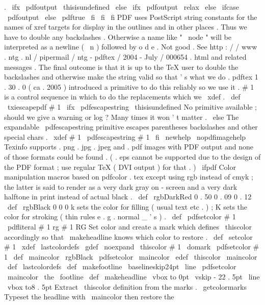 {.
\
ifx
\
pdfoutput
\
thisisundefined
\
else
\
ifx
\
pdfoutput
\
relax
\
else
\
ifcase
\
pdfoutput
\
else
\
pdftrue
\
fi
\
fi
\
fi
%
PDF
uses
PostScript
string
constants
for
the
names
of
xref
targets
%
for
display
in
the
outlines
and
in
other
places
.
Thus
we
have
to
%
double
any
backslashes
.
Otherwise
a
name
like
"
\
node
"
will
be
%
interpreted
as
a
newline
(
\
n
)
followed
by
o
d
e
.
Not
good
.
%
%
See
http
:
/
/
www
.
ntg
.
nl
/
pipermail
/
ntg
-
pdftex
/
2004
-
July
/
000654
.
html
and
%
related
messages
.
The
final
outcome
is
that
it
is
up
to
the
TeX
user
%
to
double
the
backslashes
and
otherwise
make
the
string
valid
so
%
that
'
s
what
we
do
.
pdftex
1
.
30
.
0
(
ca
.
2005
)
introduced
a
primitive
to
%
do
this
reliably
so
we
use
it
.
%
#
1
is
a
control
sequence
in
which
to
do
the
replacements
%
which
we
\
xdef
.
\
def
\
txiescapepdf
#
1
{
%
\
ifx
\
pdfescapestring
\
thisisundefined
%
No
primitive
available
;
should
we
give
a
warning
or
log
?
%
Many
times
it
won
'
t
matter
.
\
else
%
The
expandable
\
pdfescapestring
primitive
escapes
parentheses
%
backslashes
and
other
special
chars
.
\
xdef
#
1
{
\
pdfescapestring
{
#
1
}
}
%
\
fi
}
\
newhelp
\
nopdfimagehelp
{
Texinfo
supports
.
png
.
jpg
.
jpeg
and
.
pdf
images
with
PDF
output
and
none
of
those
formats
could
be
found
.
(
.
eps
cannot
be
supported
due
to
the
design
of
the
PDF
format
;
use
regular
TeX
(
DVI
output
)
for
that
.
)
}
\
ifpdf
%
%
Color
manipulation
macros
based
on
pdfcolor
.
tex
%
except
using
rgb
instead
of
cmyk
;
the
latter
is
said
to
render
as
a
%
very
dark
gray
on
-
screen
and
a
very
dark
halftone
in
print
instead
%
of
actual
black
.
\
def
\
rgbDarkRed
{
0
.
50
0
.
09
0
.
12
}
\
def
\
rgbBlack
{
0
0
0
}
%
%
k
sets
the
color
for
filling
(
usual
text
etc
.
)
;
%
K
sets
the
color
for
stroking
(
thin
rules
e
.
g
.
normal
_
'
s
)
.
\
def
\
pdfsetcolor
#
1
{
\
pdfliteral
{
#
1
rg
#
1
RG
}
}
%
%
Set
color
and
create
a
mark
which
defines
\
thiscolor
accordingly
%
so
that
\
makeheadline
knows
which
color
to
restore
.
\
def
\
setcolor
#
1
{
%
\
xdef
\
lastcolordefs
{
\
gdef
\
noexpand
\
thiscolor
{
#
1
}
}
%
\
domark
\
pdfsetcolor
{
#
1
}
%
}
%
\
def
\
maincolor
{
\
rgbBlack
}
\
pdfsetcolor
{
\
maincolor
}
\
edef
\
thiscolor
{
\
maincolor
}
\
def
\
lastcolordefs
{
}
%
\
def
\
makefootline
{
%
\
baselineskip24pt
\
line
{
\
pdfsetcolor
{
\
maincolor
}
\
the
\
footline
}
%
}
%
\
def
\
makeheadline
{
%
\
vbox
to
0pt
{
%
\
vskip
-
22
.
5pt
\
line
{
%
\
vbox
to8
.
5pt
{
}
%
%
Extract
\
thiscolor
definition
from
the
marks
.
\
getcolormarks
%
Typeset
the
headline
with
\
maincolor
then
restore
the
}}}}
